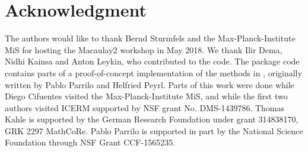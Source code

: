 \documentclass[11pt]{amsart}
\theoremstyle{plain}%
\theoremstyle{definition}
\theoremstyle{remark}
\newcommand{\Mac}{Macaulay2\xspace}
\begin{document}
\section*{Acknowledgment}
\label{sec:acknowledgement}
The authors would like to thank Bernd Sturmfels and the Max-Planck-Institute MiS for hosting the \Mac workshop in May 2018.
We thank Ilir Dema, Nidhi Kainsa and Anton Leykin, who contributed to the code.
The package code contains parts of a proof-of-concept implementation of the methods in \cite{peyrl2008computing}, originally written by Pablo Parrilo and Helfried Peyrl.
Parts of this work were done while Diego Cifuentes visited the Max-Planck-Institute MiS, and while the first two authors visited ICERM supported by NSF grant No. DMS-1439786.
Thomas Kahle is supported by the German Research Foundation under grant 314838170, GRK 2297 MathCoRe.
Pablo Parrilo is supported in part by the National Science Foundation through NSF Grant CCF-1565235.



\end{document}
